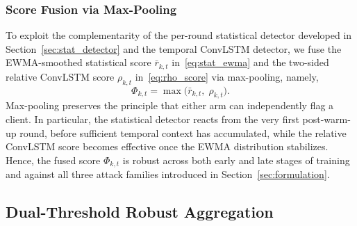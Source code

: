 \documentclass[journal]{IEEEtran}
\begin{document}
\subsubsection{Score Fusion via Max-Pooling}
To exploit the complementarity of the per-round statistical detector developed in Section~\ref{sec:stat_detector} and the temporal ConvLSTM detector, we fuse the EWMA-smoothed statistical score $\bar r_{k,t}$ in~\eqref{eq:stat_ewma} and the two-sided relative ConvLSTM score $\rho_{k,t}$ in~\eqref{eq:rho_score} via max-pooling, namely,
\begin{equation}
\Phi_{k,t} = \max\!\bigl(\bar r_{k,t},\; \rho_{k,t}\bigr).
\label{eq:fused_score}
\end{equation}
Max-pooling preserves the principle that either arm can independently flag a client. In particular, the statistical detector reacts from the very first post-warm-up round, before sufficient temporal context has accumulated, while the relative ConvLSTM score becomes effective once the EWMA distribution stabilizes. Hence, the fused score $\Phi_{k,t}$ is robust across both early and late stages of training and against all three attack families introduced in Section~\ref{sec:formulation}.
\subsection{Dual-Threshold Robust Aggregation}
\label{sec:dual_threshold}
\end{document}
